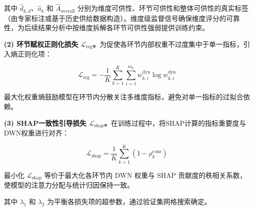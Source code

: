 其中 $\hat{d}_{k,d}$、$\hat{a}_k$ 和 $\hat{A}_{\text{overall}}$ 分别为维度可供性、环节可供性和整体可供性的真实标签（由专家标注或基于历史供给数据构造）。维度级监督信号确保维度评分的可靠性，为后续结果分析中按维度拆解各环节可供性强弱提供训练约束。

\textbf{(2) 环节赋权正则化损失 $\mathcal{L}_{\text{reg}}$。}为促使各环节内部权重不过度集中于单一指标，引入熵正则化项：

\begin{equation}
\mathcal{L}_{\text{reg}} = -\frac{1}{K}\sum_{k=1}^{K}\sum_{i=1}^{m_k} w_{k,i}^{\text{dyn}}\log w_{k,i}^{\text{dyn}}
\end{equation}

最大化权重熵鼓励模型在环节内分散关注多维度指标，避免对单一指标的过拟合依赖。

\textbf{(3) SHAP一致性引导损失 $\mathcal{L}_{\text{shap}}$。}在训练过程中，将SHAP计算的指标重要度与DWN权重进行对齐：

\begin{equation}
\mathcal{L}_{\text{shap}} = \frac{1}{K}\sum_{k=1}^{K}(1 - \rho_k^{\text{cons}})
\end{equation}

最小化 $\mathcal{L}_{\text{shap}}$ 等价于最大化各环节内 DWN 权重与 SHAP 贡献度的秩相关系数，使模型的注意力分配与统计归因保持一致。

其中 $\lambda_1$ 和 $\lambda_2$ 为平衡各损失项的超参数，通过验证集网格搜索确定。
